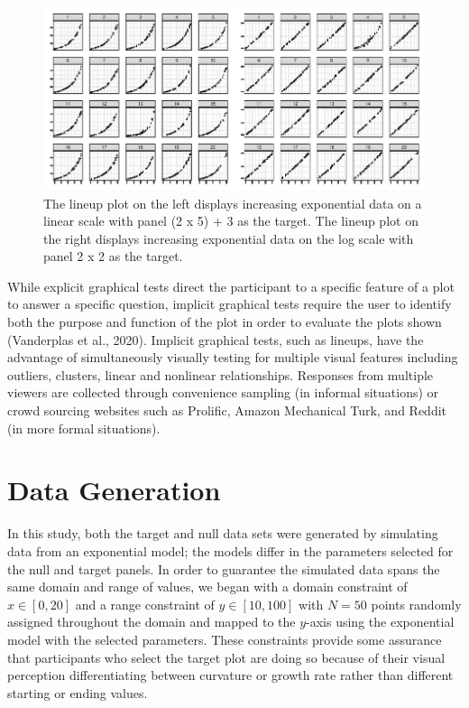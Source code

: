 \documentclass[print]{nuthesis}
\begin{document}
\begin{figure}[tbp]

{\centering \includegraphics[width=\linewidth,]{thesis_files/figure-latex/lineup-example-1} 

}

\caption[Lineup examples]{The lineup plot on the left displays increasing exponential data on a linear scale with panel (2 x 5) + 3 as the target. The lineup plot on the right displays increasing exponential data on the log scale with panel 2 x 2 as the target.}\label{fig:lineup-example}
\end{figure}

While explicit graphical tests direct the participant to a specific feature of a plot to answer a specific question, implicit graphical tests require the user to identify both the purpose and function of the plot in order to evaluate the plots shown (Vanderplas et al., 2020).
Implicit graphical tests, such as lineups, have the advantage of simultaneously visually testing for multiple visual features including outliers, clusters, linear and nonlinear relationships. Responses from multiple viewers are collected through convenience sampling (in informal situations) or crowd sourcing websites such as Prolific, Amazon Mechanical Turk, and Reddit (in more formal situations).

\hypertarget{data-generation}{%
\section{Data Generation}\label{data-generation}}

In this study, both the target and null data sets were generated by simulating data from an exponential model; the models differ in the parameters selected for the null and target panels.
In order to guarantee the simulated data spans the same domain and range of values, we began with a domain constraint of \(x\in [0,20]\) and a range constraint of \(y\in [10,100]\) with \(N = 50\) points randomly assigned throughout the domain and mapped to the \(y\)-axis using the exponential model with the selected parameters.
These constraints provide some assurance that participants who select the target plot are doing so because of their visual perception differentiating between curvature or growth rate rather than different starting or ending values.
\end{document}
